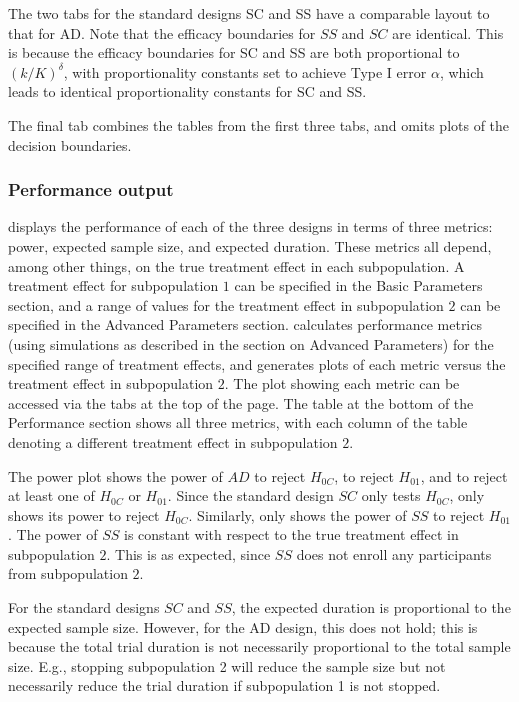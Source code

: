 \documentclass[article]{jss}
\begin{document}
The two tabs for the standard designs SC and SS have a comparable layout to that for AD. Note that the efficacy boundaries for $SS$ and $SC$ are identical. This is because the efficacy boundaries for SC and SS are both proportional to $(k/K)^\delta$, with proportionality constants set to achieve Type I error $\alpha$, which leads to identical proportionality constants for SC and SS.

The final tab combines the tables from the first three tabs, and omits plots of the decision boundaries.


\subsubsection{Performance output}
\label{sub:performance-output}

 displays the performance of each of the three designs in terms of three metrics: power, expected sample size, and expected duration. These metrics all depend, among other things, on the true treatment effect in each subpopulation. A treatment effect for subpopulation $1$ can be specified in the Basic Parameters section, and a range of values for the treatment effect in subpopulation $2$ can be specified in the Advanced Parameters section.  calculates performance metrics (using simulations as described in the section on Advanced Parameters) for the specified range of treatment effects, and generates plots  of each metric versus the treatment effect in subpopulation $2$. The plot showing each metric can be accessed via the tabs at the top of the page. The table at the bottom of the Performance section shows all three metrics, with each column of the table denoting a different treatment effect in subpopulation $2$.


The power plot shows the power of $AD$ to reject $H_{0C}$, to reject $H_{01}$, and to reject at least one of $H_{0C}$ or $H_{01}$. Since the standard design $SC$ only tests $H_{0C}$,  only shows its power to reject $H_{0C}$. Similarly,  only shows the power of $SS$ to reject $H_{01}$. 
The power of $SS$ is constant with respect to the true treatment effect in subpopulation $2$. This is as expected, since $SS$ does not enroll any participants from subpopulation $2$. 

For the standard designs $SC$ and $SS$, the expected duration is proportional to the expected sample size. 
However, for the AD design, this does not hold; this is because the total trial duration is not necessarily proportional to the total sample size. E.g., stopping subpopulation 2 will reduce the sample size but not necessarily reduce the trial duration if subpopulation 1 is not stopped.
\end{document}
